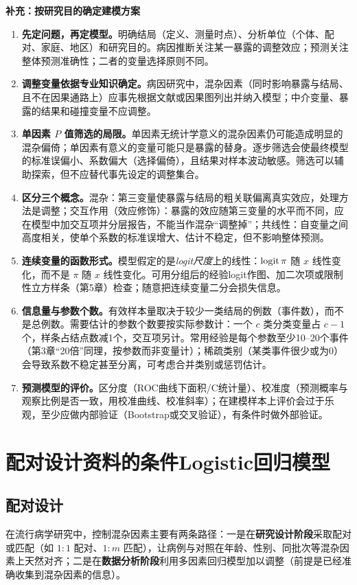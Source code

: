 \textbf{补充：按研究目的确定建模方案}
\begin{enumerate}
\item \textbf{先定问题，再定模型。}明确结局（定义、测量时点）、分析单位（个体、配对、家庭、地区）和研究目的。病因推断关注某一暴露的调整效应；预测关注整体预测准确性；二者的变量选择原则不同。
\item \textbf{调整变量依据专业知识确定。}病因研究中，混杂因素（同时影响暴露与结局、且不在因果通路上）应事先根据文献或因果图列出并纳入模型；中介变量、暴露的结果和碰撞变量不应调整。
\item \textbf{单因素 $P$ 值筛选的局限。}单因素无统计学意义的混杂因素仍可能造成明显的混杂偏倚；单因素有意义的变量可能只是暴露的替身。逐步筛选会使最终模型的标准误偏小、系数偏大（选择偏倚），且结果对样本波动敏感。筛选可以辅助探索，但不应替代事先设定的调整集合。
\item \textbf{区分三个概念。}混杂：第三变量使暴露与结局的粗关联偏离真实效应，处理方法是调整；交互作用（效应修饰）：暴露的效应随第三变量的水平而不同，应在模型中加交互项并分层报告，不能当作混杂“调整掉”；共线性：自变量之间高度相关，使单个系数的标准误增大、估计不稳定，但不影响整体预测。
\item \textbf{连续变量的函数形式。}模型假定的是\emph{logit尺度}上的线性：$\operatorname{logit}\pi$ 随 $x$ 线性变化，而不是 $\pi$ 随 $x$ 线性变化。可用分组后的经验logit作图、加二次项或限制性立方样条（第5章）检查；随意把连续变量二分会损失信息。
\item \textbf{信息量与参数个数。}有效样本量取决于较少一类结局的例数（事件数），而不是总例数。需要估计的参数个数要按实际参数计：一个 $c$ 类分类变量占 $c-1$ 个，样条占结点数减1个，交互项另计。常用经验是每个参数至少10--20个事件（第3章“20倍”同理，按参数而非变量计）；稀疏类别（某类事件很少或为0）会导致系数不稳定甚至分离，可考虑合并类别或惩罚估计。
\item \textbf{预测模型的评价。}区分度（ROC曲线下面积/C统计量）、校准度（预测概率与观察比例是否一致，用校准曲线、校准斜率）；在建模样本上评价会过于乐观，至少应做内部验证（Bootstrap或交叉验证），有条件时做外部验证。
\end{enumerate}
\section{配对设计资料的条件Logistic回归模型}
\subsection{配对设计}
在流行病学研究中，控制混杂因素主要有两条路径：一是在\textbf{研究设计阶段}采取配对或匹配（如 $1:1$ 配对、$1:m$ 匹配），让病例与对照在年龄、性别、同批次等混杂因素上天然对齐；二是在\textbf{数据分析阶段}利用多因素回归模型加以调整（前提是已经准确收集到混杂因素的信息）。


